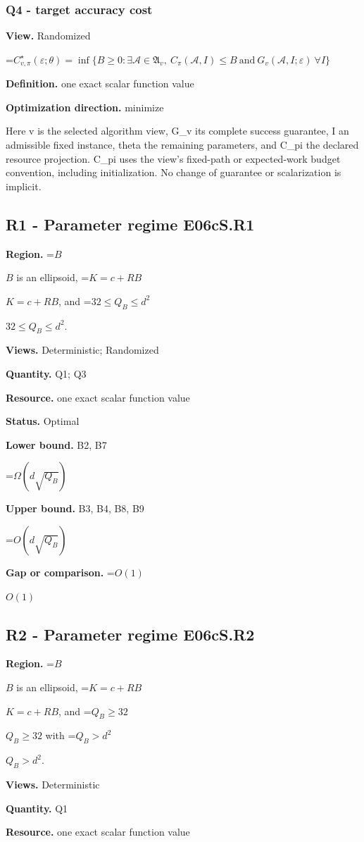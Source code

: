 \documentclass[10pt,a4paper]{article}
\newcommand{\AtlasMath}[1]{\par\begingroup\centering\setbox0=\hbox{$\displaystyle #1$}\ifdim\wd0>1.4\linewidth\typeout{ATLAS WIDE FORMULA: \the\wd0}\fi\ifdim\wd0>\linewidth\resizebox{\linewidth}{!}{\box0}\else\box0\fi\par\endgroup}
\newcommand{\AtlasInlineMath}[1]{\begingroup\setbox0=\hbox{$#1$}\ifdim\wd0>.4\linewidth\endgroup\AtlasMath{#1}\else\endgroup$#1$\fi}
\begin{document}
\subsubsection{Q4 - target accuracy cost}
\textbf{View.} Randomized

\AtlasMath{C^\star_{v,\pi}(\varepsilon;\theta)=\inf\{B\ge0:\exists\mathcal A\in\mathfrak A_v,\ C_\pi(\mathcal A,I)\le B\ \text{and}\ G_v(\mathcal A,I;\varepsilon)\ \forall I\}}
\textbf{Definition.} one exact scalar function value

\textbf{Optimization direction.} minimize

Here v is the selected algorithm view, G\_v its complete success guarantee, I an admissible fixed instance, theta the remaining parameters, and C\_pi the declared resource projection. C\_pi uses the view's fixed-path or expected-work budget convention, including initialization. No change of guarantee or scalarization is implicit.

\subsection{R1 - Parameter regime E06cS.R1}
\textbf{Region.} \AtlasInlineMath{B} is an ellipsoid, \AtlasInlineMath{K=c+RB}, and \AtlasInlineMath{32\le Q_B\le d^2}.

\textbf{Views.} Deterministic; Randomized

\textbf{Quantity.} Q1; Q3

\textbf{Resource.} one exact scalar function value

\textbf{Status.} Optimal

\textbf{Lower bound.} B2, B7

\AtlasMath{\Omega(d\sqrt{Q_B})}
\textbf{Upper bound.} B3, B4, B8, B9

\AtlasMath{O(d\sqrt{Q_B})}
\textbf{Gap or comparison.} \AtlasInlineMath{O(1)}

\subsection{R2 - Parameter regime E06cS.R2}
\textbf{Region.} \AtlasInlineMath{B} is an ellipsoid, \AtlasInlineMath{K=c+RB}, and \AtlasInlineMath{Q_B\ge32} with \AtlasInlineMath{Q_B>d^2}.

\textbf{Views.} Deterministic

\textbf{Quantity.} Q1

\textbf{Resource.} one exact scalar function value
\end{document}
